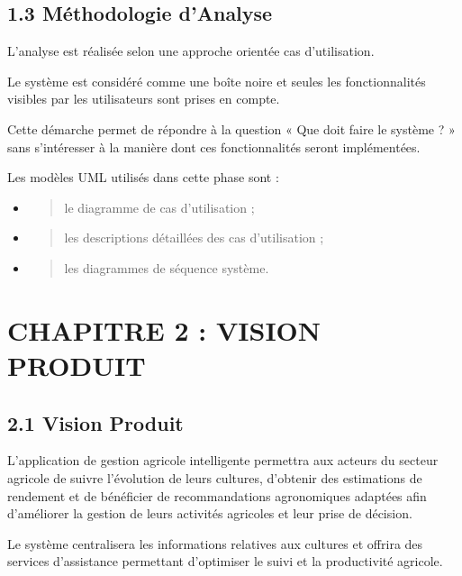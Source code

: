 \documentclass[
]{book}
\begin{document}
\hypertarget{muxe9thodologie-danalyse}{%
\section{1.3 Méthodologie d'Analyse}\label{muxe9thodologie-danalyse}}

L'analyse est réalisée selon une approche orientée cas d'utilisation.

Le système est considéré comme une boîte noire et seules les
fonctionnalités visibles par les utilisateurs sont prises en compte.

Cette démarche permet de répondre à la question « Que doit faire le
système ? » sans s'intéresser à la manière dont ces fonctionnalités
seront implémentées.

Les modèles UML utilisés dans cette phase sont :

\begin{itemize}
\item
  \begin{quote}
  le diagramme de cas d'utilisation ;
  \end{quote}
\item
  \begin{quote}
  les descriptions détaillées des cas d'utilisation ;
  \end{quote}
\item
  \begin{quote}
  les diagrammes de séquence système.
  \end{quote}
\end{itemize}

\hypertarget{chapitre-2-vision-produit}{%
\chapter{CHAPITRE 2 : VISION PRODUIT}\label{chapitre-2-vision-produit}}

\hypertarget{vision-produit}{%
\section{2.1 Vision Produit}\label{vision-produit}}

L'application de gestion agricole intelligente permettra aux acteurs du
secteur agricole de suivre l'évolution de leurs cultures, d'obtenir des
estimations de rendement et de bénéficier de recommandations
agronomiques adaptées afin d'améliorer la gestion de leurs activités
agricoles et leur prise de décision.

Le système centralisera les informations relatives aux cultures et
offrira des services d'assistance permettant d'optimiser le suivi et la
productivité agricole.
\end{document}
